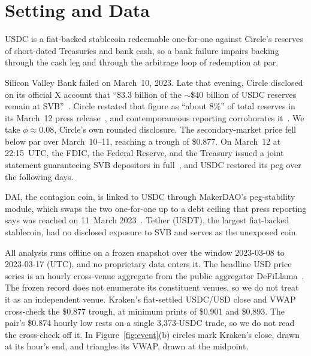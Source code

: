 \section{Setting and Data}
\label{sec:setting}

USDC is a fiat-backed stablecoin redeemable one-for-one against Circle's
reserves of short-dated Treasuries and bank cash, so a bank failure impairs
backing through the cash leg and through the arbitrage loop of redemption at par.

Silicon Valley Bank failed on March~10, 2023. Late that evening, Circle
disclosed on its official X account that ``\$3.3 billion of the
${\sim}$\$40 billion of USDC reserves remain at SVB''~\cite{circle2023tweet}.
Circle restated that figure as ``about $8\%$'' of total reserves in its
March~12 press release~\cite{circle2023pressrelease}, and contemporaneous
reporting corroborates it~\cite{capoot2023}. We take $\phi\approx 0.08$,
Circle's own rounded disclosure. The
secondary-market price fell below par over March~10--11, reaching a trough of
\$0.877. On March~12 at 22:15~UTC, the FDIC, the Federal Reserve, and the
Treasury issued a joint statement guaranteeing SVB depositors in
full~\cite{fedtreasfdic2023pressrelease}, and USDC restored its peg over the
following days.

DAI, the contagion coin, is linked to USDC through MakerDAO's
peg-stability module, which swaps the two one-for-one up to a debt ceiling that
press reporting says was reached on 11~March 2023~\cite{theblock2023psm}.
Tether (USDT), the largest fiat-backed stablecoin, had no disclosed exposure to
SVB and serves as the unexposed coin.

All analysis runs offline on a frozen snapshot over the window 2023-03-08 to
2023-03-17 (UTC), and no proprietary data enters it. The headline USD price
series is an hourly cross-venue aggregate from the public aggregator
DeFiLlama~\cite{defillama2026api}. The
frozen record does not enumerate its constituent venues, so we do not treat it as an
independent venue. Kraken's fiat-settled USDC/USD close and
VWAP~\cite{kraken2026api} cross-check the \$0.877
trough, at minimum prints of \$0.901 and \$0.893. The pair's \$0.874 hourly low rests on
a single 3{,}373-USDC trade, so we do not read the cross-check off it. In
Figure~\ref{fig:event}(b) circles mark Kraken's close, drawn at its hour's end, and
triangles its VWAP, drawn at the midpoint.
